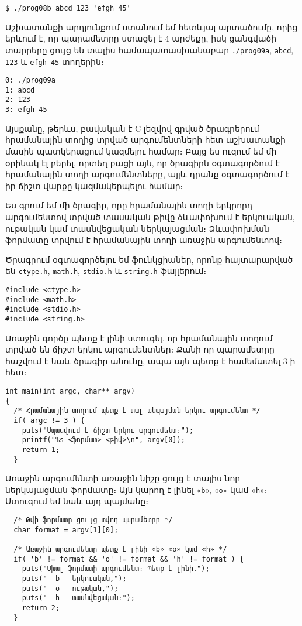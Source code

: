 \begin{Verbatim}
$ ./prog08b abcd 123 'efgh 45'
\end{Verbatim}

Աշխատանքի արդյունքում ստանում եմ հետևյալ արտածումը, որից երևում
է, որ  պարամետրը ստացել է 4 արժեքը, իսկ 
ցանգվածի տարրերը ցույց են տալիս համապատասխանաբար \texttt{./prog09a},
\texttt{abcd}, \texttt{123} և \texttt{efgh 45} տողերին։

\begin{Verbatim}
0: ./prog09a
1: abcd
2: 123
3: efgh 45
\end{Verbatim}

Այսքանը, թերևս, բավական է C լեզվով գրված ծրագրերում հրամանային
տողից տրված արգումենտների հետ աշխատանքի մասին պատկերացում կազմելու
համար։ Բայց ես ուզում եմ մի օրինակ էլ բերել, որտեղ բացի այն,
որ ծրագիրն օգտագործում է հրամանային տողի արգումենտները, այլև
դրանք օգտագործում է իր ճիշտ վարքը կազմակերպելու համար։

Ես գրում եմ մի ծրագիր, որը հրամանային տողի երկրորդ արգումենտով
տրված տասական թիվը ձևափոխում է երկուական, ութական կամ տասնվեցական
ներկայացման։ Ձևափոխման ֆորմատը տրվում է հրամանային տողի առաջին
արգումենտով։

Ծրագրում օգտագործելու եմ ֆունկցիաներ, որոնք հայտարարված են
\texttt{ctype.h}, \texttt{math.h}, \texttt{stdio.h} և
\texttt{string.h} ֆայլերում։

\begin{Verbatim}
#include <ctype.h>
#include <math.h>
#include <stdio.h>
#include <string.h>
\end{Verbatim}

Առաջին գործը պետք է լինի ստուգել, որ հրամանային տողում տրված
են ճիշտ երկու արգումենտներ։ Քանի որ  պարամետրը
հաշվում է նաև ծրագիր անունը, ապա այն պետք է համեմատել 3-ի հետ։

\begin{Verbatim}
int main(int argc, char** argv)
{
  /* Հրամանային տողում պետք է տալ անպայման երկու արգումենտ */
  if( argc != 3 ) {
    puts("Սպասվում է ճիշտ երկու արգումենտ։");
    printf("%s <ֆորմատ> <թիվ>\n", argv[0]);
    return 1;
  }
\end{Verbatim}

Առաջին արգումենտի առաջին նիշը ցույց է տալիս նոր ներկայացման
ֆորմատը։ Այն կարող է լինել «\texttt{b}», «\texttt{o}» կամ
«\texttt{h}»։ Ստուգում եմ նաև այդ պայմանը։

\begin{Verbatim}
  /* Թվի ֆորմատը ցույց տվող պարամետրը */
  char format = argv[1][0];

  /* Առաջին արգումենտը պետք է լինի «b» «o» կամ «h» */
  if( 'b' != format && 'o' != format && 'h' != format ) {
    puts("Սխալ ֆորմատի արգումենտ։ Պետք է լինի․");
    puts("  b - երկուական,");
    puts("  օ - ութական,");
    puts("  հ - տասնվեցական։");
    return 2;
  }
\end{Verbatim}

